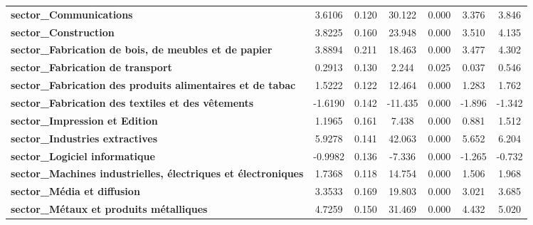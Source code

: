 \begin{center}
\begin{tabular}{lcccccc}
\textbf{sector\_Communications}                                       &       3.6106  &        0.120     &    30.122  &         0.000        &        3.376    &        3.846     \\
\textbf{sector\_Construction}                                         &       3.8225  &        0.160     &    23.948  &         0.000        &        3.510    &        4.135     \\
\textbf{sector\_Fabrication de bois, de meubles et de papier}         &       3.8894  &        0.211     &    18.463  &         0.000        &        3.477    &        4.302     \\
\textbf{sector\_Fabrication de transport}                             &       0.2913  &        0.130     &     2.244  &         0.025        &        0.037    &        0.546     \\
\textbf{sector\_Fabrication des produits alimentaires et de tabac}    &       1.5222  &        0.122     &    12.464  &         0.000        &        1.283    &        1.762     \\
\textbf{sector\_Fabrication des textiles et des vêtements}            &      -1.6190  &        0.142     &   -11.435  &         0.000        &       -1.896    &       -1.342     \\
\textbf{sector\_Impression et Edition}                                &       1.1965  &        0.161     &     7.438  &         0.000        &        0.881    &        1.512     \\
\textbf{sector\_Industries extractives}                               &       5.9278  &        0.141     &    42.063  &         0.000        &        5.652    &        6.204     \\
\textbf{sector\_Logiciel informatique}                                &      -0.9982  &        0.136     &    -7.336  &         0.000        &       -1.265    &       -0.732     \\
\textbf{sector\_Machines industrielles, électriques et électroniques} &       1.7368  &        0.118     &    14.754  &         0.000        &        1.506    &        1.968     \\
\textbf{sector\_Média et diffusion}                                   &       3.3533  &        0.169     &    19.803  &         0.000        &        3.021    &        3.685     \\
\textbf{sector\_Métaux et produits métalliques}                       &       4.7259  &        0.150     &    31.469  &         0.000        &        4.432    &        5.020     \\

\end{tabular}
\end{center}
